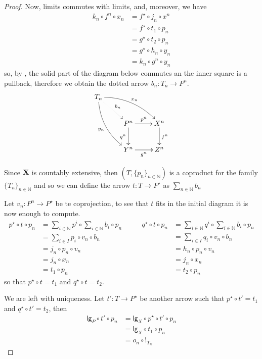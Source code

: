 \documentclass[runningheads,envcountsect]{llncs}
\newcommand{\lgh}{\mathsf{lg}}
\def\X{\textbf {\textup{X}}}
\begin{document}
\begin{proof}
	
	Now, limits commutes with limits, and, moreover, we have
	\begin{align*}	
	k_n\circ f^n\circ x_n & =f^\star \circ j_n\circ x^n\\&=f^\star \circ t_1\circ p_n\\&=g^\star \circ t_2\circ p_n\\&=g^\star \circ h_n\circ y_n\\&=k_n \circ g^n\circ y_n 
	\end{align*}
	so, by , the solid part of the diagram below commutes an the inner square is a pullback, therefore we obtain the dotted arrow $b_n\colon T_n\to P^n $.
	\[\xymatrix{T_n \ar@{.>}[dr]^{b_n}  \ar@/^.4cm/[drr]^{x_n} \ar@/_.4cm/[ddr]_{y_n} \\ & P^n \ar[d]_{q^n} \ar[r]^{p^n}& X^n \ar[d]^{f^n}\\ &  Y^n  \ar[r]_{g^n}& Z^n}\]
	
	Since $\X$ is countably extensive, then $(T, \{p_n\}_{n\in \mathbb{N}})$ is a coproduct for the family $\{T_n\}_{n\in \mathbb{N}}$ and so we can define the arrow $t\colon T\to P^\star$ as $\sum_{n\in \mathbb{N}} b_n$
	
	Let $v_n\colon P^n\to P^\star$ be te coprojection, to see that $t$ fits in the initial diagram it is now enough to compute.
	\[\begin{split}
		p^\star \circ t \circ p_n&= \sum_{i\in \mathbb{N}} p^i \circ \sum_{i\in \mathbb{N}} b_i\circ p_n\\&
		=\sum_{i\in I}p_i\circ v_n\circ b_n\\&= j_n\circ p_n\circ v_n\\&=j_n\circ x_n\\&=t_1\circ p_n
 	\end{split} \qquad \begin{split}
 	q^\star \circ t \circ p_n&= \sum_{i\in \mathbb{N}} q^i \circ \sum_{i\in \mathbb{N}} b_i\circ p_n\\&
 	=\sum_{i\in I}q_i\circ v_n\circ b_n\\&= h_n\circ p_n\circ v_n\\&=j_n\circ x_n\\&=t_2\circ p_n
 	\end{split}\]
 	so that $p^\star \circ t = t_1$ and $q^\star\circ t = t_2$.
	
We are left with uniqueness. Let $t'\colon T\to P^\star$ be another arrow such that $p^\star \circ t' = t_1$ and $q^\star\circ t' = t_2$, then
\begin{align*}
\lgh_P\circ t' \circ p_n&=\lgh_X\circ p^\star \circ t'\circ p_n\\&=\lgh_X\circ t_1\circ p_n\\&=o_n\circ !_{T_n}
\end{align*}


\end{proof}
\end{document}
